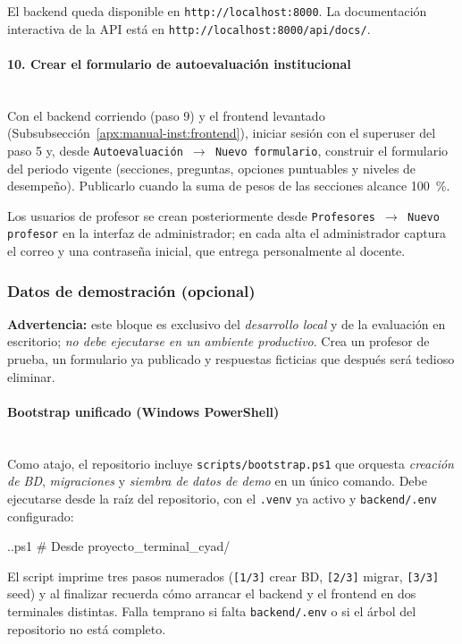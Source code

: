El backend queda disponible en \texttt{http://localhost:8000}. La documentación interactiva de la API está en \texttt{http://localhost:8000/api/docs/}.

\paragraph{10. Crear el formulario de autoevaluación institucional}\mbox{}\\
Con el backend corriendo (paso 9) y el frontend levantado (Subsubsección~\ref{apx:manual-inst:frontend}), iniciar sesión con el superuser del paso 5 y, desde \texttt{Autoevaluación $\to$ Nuevo formulario}, construir el formulario del periodo vigente (secciones, preguntas, opciones puntuables y niveles de desempeño). Publicarlo cuando la suma de pesos de las secciones alcance 100~\%.

Los usuarios de profesor se crean posteriormente desde \texttt{Profesores $\to$ Nuevo profesor} en la interfaz de administrador; en cada alta el administrador captura el correo y una contraseña inicial, que entrega personalmente al docente.

\subsubsection{Datos de demostración (opcional)}
\label{apx:manual-inst:datos-demo}

\textbf{Advertencia:} este bloque es exclusivo del \emph{desarrollo local} y de la evaluación en escritorio; \emph{no debe ejecutarse en un ambiente productivo}. Crea un profesor de prueba, un formulario ya publicado y respuestas ficticias que después será tedioso eliminar.

\paragraph{Bootstrap unificado (Windows PowerShell)}\mbox{}\\
Como atajo, el repositorio incluye \texttt{scripts/bootstrap.ps1} que orquesta \emph{creación de BD}, \emph{migraciones} y \emph{siembra de datos de demo} en un único comando. Debe ejecutarse desde la raíz del repositorio, con el \texttt{.venv} ya activo y \texttt{backend/.env} configurado:

\begin{Comandos}
.\scripts\bootstrap.ps1    # Desde proyecto_terminal_cyad/
\end{Comandos}

El script imprime tres pasos numerados (\texttt{[1/3]} crear BD, \texttt{[2/3]} migrar, \texttt{[3/3]} seed) y al finalizar recuerda cómo arrancar el backend y el frontend en dos terminales distintas. Falla temprano si falta \texttt{backend/.env} o si el árbol del repositorio no está completo.

